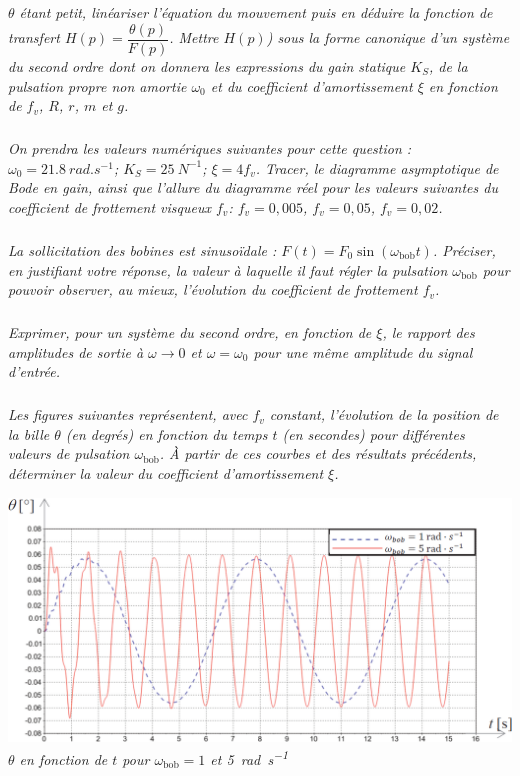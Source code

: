 \documentclass[10pt,fleqn]{article} %
\begin{document}
\begin{multicols}{2}
\subparagraph{}\textit{$\theta$ étant petit, linéariser l’équation du mouvement puis en déduire la fonction de transfert $H(p)=\dfrac{\theta(p)}{F(p)}$. Mettre $H(p)$) sous la forme canonique d’un système du second ordre dont on donnera les expressions du gain statique $K_S$, de la pulsation propre non amortie $\omega_0$ et du
coefficient d’amortissement $\xi$ en fonction de $f_v$, $R$, $r$, $m$ et $g$.}

\subparagraph{}\textit{On prendra les valeurs numériques suivantes pour cette question :
$\omega_0 = \SI{21,8}{rad.s^{-1}}$; $K_S = \SI{25}{N^{-1}}$; $\xi=4f_v$.
Tracer, le diagramme asymptotique de Bode en gain, ainsi que l’allure
du diagramme réel pour les valeurs suivantes du coefficient de frottement visqueux $f_v$: $f_v=0,005$, $f_v=0,05$, $f_v=0,02$.}

\subparagraph{}\textit{La sollicitation des bobines est sinusoïdale : $F(t)=F_0 \sin \left( \omega_{\text{bob}}t\right)$. Préciser, en
justifiant votre réponse, la valeur à laquelle il faut régler la pulsation $\omega_{\text{bob}}$ pour pouvoir observer, au mieux, l’évolution du coefficient de frottement $f_v$.}

\subparagraph{}\textit{Exprimer, pour un système du second ordre, en fonction de $\xi$, le rapport des amplitudes de sortie à $\omega \to 0$ et $\omega=\omega_0$ pour une même amplitude du signal d’entrée.}

\subparagraph{}\textit{Les figures suivantes représentent, avec $f_v$ constant, l’évolution de la
position de la bille $\theta$ (en degrés) en fonction du temps $t$ (en secondes)  pour différentes valeurs de pulsation $\omega_{\text{bob}}$. À partir de ces courbes et des résultats précédents, déterminer la valeur du coefficient d’amortissement $\xi$.}

\begin{minipage}[c]{.48\linewidth}
\begin{center}
\includegraphics[width=\linewidth]{images/ccp_06}
\textit{$\theta$ en fonction de $t$  pour $\omega_{\text{bob}}= 1$ et \SI{5}{rad.s^{-1}}}
\end{center}


\end{minipage}
\end{multicols}
\end{document}
